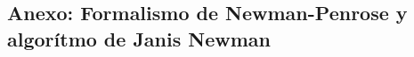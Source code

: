 \begin{appendix}
\chapter{Anexo: Formalismo de Newman-Penrose y algorítmo de Janis Newman}\label{AnexoA}




\end{appendix}